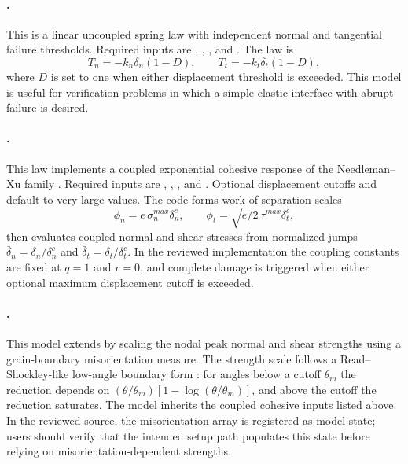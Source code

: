 \paragraph{.}
This is a linear uncoupled spring law with independent normal and tangential failure thresholds.  Required inputs are , , , and .  The law is
\begin{equation}
  T_n=-k_n\delta_n(1-D),
  \qquad
  T_t=-k_t\delta_t(1-D),
  \label{eq:cz-uncoupled}
\end{equation}
where $D$ is set to one when either displacement threshold is exceeded.  This model is useful for verification problems in which a simple elastic interface with abrupt failure is desired.

\paragraph{.}
This law implements a coupled exponential cohesive response of the Needleman--Xu family \cite{xuneedleman1994}.  Required inputs are , , , and .  Optional displacement cutoffs  and  default to very large values.  The code forms work-of-separation scales
\begin{equation}
  \phi_n = e\,\sigma^{max}_n\delta^c_n,
  \qquad
  \phi_t = \sqrt{e/2}\,\tau^{max}\delta^c_t,
  \label{eq:cz-coupled-work}
\end{equation}
then evaluates coupled normal and shear stresses from normalized jumps $\bar{\delta}_n=\delta_n/\delta^c_n$ and $\bar{\delta}_t=\delta_t/\delta^c_t$.  In the reviewed implementation the coupling constants are fixed at $q=1$ and $r=0$, and complete damage is triggered when either optional maximum displacement cutoff is exceeded.

\paragraph{.}
This model extends  by scaling the nodal peak normal and shear strengths using a grain-boundary misorientation measure.  The strength scale follows a Read--Shockley-like low-angle boundary form \cite{readshockley1950}: for angles below a cutoff $\theta_m$ the reduction depends on $(\theta/\theta_m)\left[1-\log(\theta/\theta_m)\right]$, and above the cutoff the reduction saturates.  The model inherits the coupled cohesive inputs listed above.  In the reviewed source, the misorientation array is registered as model state; users should verify that the intended setup path populates this state before relying on misorientation-dependent strengths.

